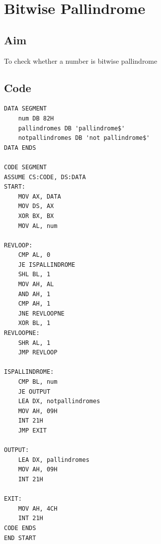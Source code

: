 \section{Bitwise Pallindrome}
\subsection{Aim}
To check whether a number is bitwise pallindrome

\subsection{Code}
\begin{lstlisting}
DATA SEGMENT
    num DB 82H
    pallindromes DB 'pallindrome$'
    notpallindromes DB 'not pallindrome$'
DATA ENDS

CODE SEGMENT
ASSUME CS:CODE, DS:DATA
START:
    MOV AX, DATA
    MOV DS, AX
    XOR BX, BX
    MOV AL, num

REVLOOP:
    CMP AL, 0
    JE ISPALLINDROME
    SHL BL, 1
    MOV AH, AL
    AND AH, 1
    CMP AH, 1
    JNE REVLOOPNE
    XOR BL, 1
REVLOOPNE:
    SHR AL, 1
    JMP REVLOOP

ISPALLINDROME:
    CMP BL, num
    JE OUTPUT
    LEA DX, notpallindromes
    MOV AH, 09H
    INT 21H
    JMP EXIT
    
OUTPUT:   
    LEA DX, pallindromes
    MOV AH, 09H
    INT 21H  
    
EXIT:
    MOV AH, 4CH
    INT 21H
CODE ENDS
END START

\end{lstlisting}

